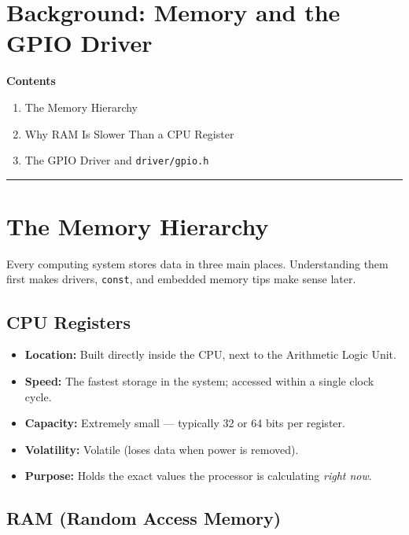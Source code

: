 \documentclass[11pt]{article}
\begin{document}
\section*{Background: Memory and the GPIO Driver}

\textbf{Contents}
\begin{enumerate}
    \item The Memory Hierarchy
    \item Why RAM Is Slower Than a CPU Register
    \item The GPIO Driver and \texttt{driver/gpio.h}
\end{enumerate}

\noindent\rule{\textwidth}{0.4pt}
\vspace{1em}

\section{The Memory Hierarchy}

Every computing system stores data in three main places. Understanding them first makes drivers, \texttt{const}, and embedded memory tips make sense later.

\subsection{CPU Registers}

\begin{itemize}
    \item \textbf{Location:} Built directly inside the CPU, next to the Arithmetic Logic Unit.
    \item \textbf{Speed:} The fastest storage in the system; accessed within a single clock cycle.
    \item \textbf{Capacity:} Extremely small --- typically 32 or 64 bits per register.
    \item \textbf{Volatility:} Volatile (loses data when power is removed).
    \item \textbf{Purpose:} Holds the exact values the processor is calculating \emph{right now}.
\end{itemize}

\subsection{RAM (Random Access Memory)}
\end{document}
